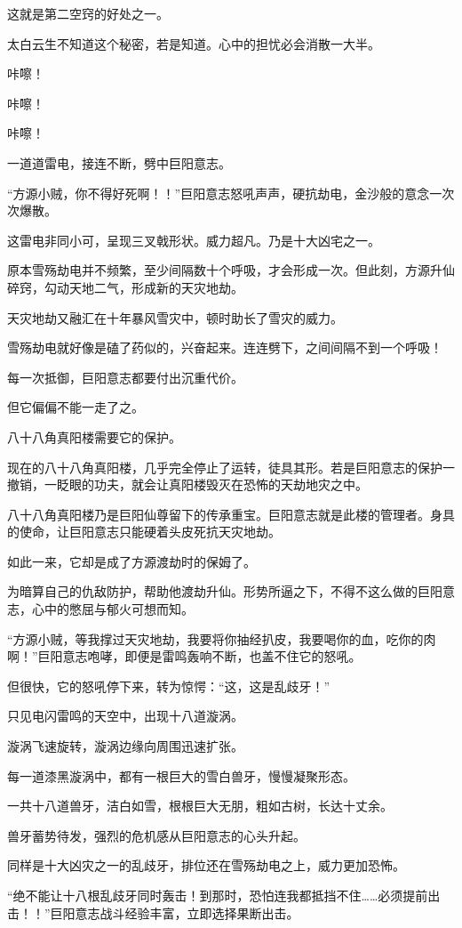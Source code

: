 \begin{this_body}
这就是第二空窍的好处之一。

太白云生不知道这个秘密，若是知道。心中的担忧必会消散一大半。

咔嚓！

咔嚓！

咔嚓！

一道道雷电，接连不断，劈中巨阳意志。

“方源小贼，你不得好死啊！！”巨阳意志怒吼声声，硬抗劫电，金沙般的意念一次次爆散。

这雷电非同小可，呈现三叉戟形状。威力超凡。乃是十大凶宅之一。

原本雪殇劫电并不频繁，至少间隔数十个呼吸，才会形成一次。但此刻，方源升仙碎窍，勾动天地二气，形成新的天灾地劫。

天灾地劫又融汇在十年暴风雪灾中，顿时助长了雪灾的威力。

雪殇劫电就好像是磕了药似的，兴奋起来。连连劈下，之间间隔不到一个呼吸！

每一次抵御，巨阳意志都要付出沉重代价。

但它偏偏不能一走了之。

八十八角真阳楼需要它的保护。

现在的八十八角真阳楼，几乎完全停止了运转，徒具其形。若是巨阳意志的保护一撤销，一眨眼的功夫，就会让真阳楼毁灭在恐怖的天劫地灾之中。

八十八角真阳楼乃是巨阳仙尊留下的传承重宝。巨阳意志就是此楼的管理者。身具的使命，让巨阳意志只能硬着头皮死抗天灾地劫。

如此一来，它却是成了方源渡劫时的保姆了。

为暗算自己的仇敌防护，帮助他渡劫升仙。形势所逼之下，不得不这么做的巨阳意志，心中的憋屈与郁火可想而知。

“方源小贼，等我撑过天灾地劫，我要将你抽经扒皮，我要喝你的血，吃你的肉啊！”巨阳意志咆哮，即便是雷鸣轰响不断，也盖不住它的怒吼。

但很快，它的怒吼停下来，转为惊愕：“这，这是乱歧牙！”

只见电闪雷鸣的天空中，出现十八道漩涡。

漩涡飞速旋转，漩涡边缘向周围迅速扩张。

每一道漆黑漩涡中，都有一根巨大的雪白兽牙，慢慢凝聚形态。

一共十八道兽牙，洁白如雪，根根巨大无朋，粗如古树，长达十丈余。

兽牙蓄势待发，强烈的危机感从巨阳意志的心头升起。

同样是十大凶灾之一的乱歧牙，排位还在雪殇劫电之上，威力更加恐怖。

“绝不能让十八根乱歧牙同时轰击！到那时，恐怕连我都抵挡不住……必须提前出击！！”巨阳意志战斗经验丰富，立即选择果断出击。


\end{this_body}
